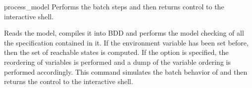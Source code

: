 \begin{nusmvCommand}{process\_model} {Performs the batch steps and then returns control to the interactive shell.}


Reads the model, compiles it into BDD and performs the model checking
of all the specification contained in it. If the environment variable
 has been set before, then the set of
reachable states is computed. If the option  is specified,
the reordering of variables is performed and a dump of the variable
ordering is performed accordingly. This command simulates the batch
behavior of \nusmv and then returns the control to the interactive
shell.

\begin{cmdOpt}
 
 

\end{cmdOpt}
\end{nusmvCommand}
